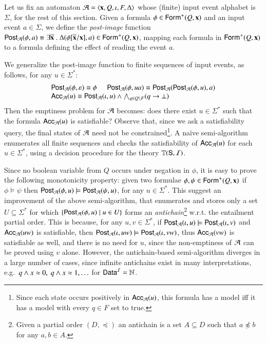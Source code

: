 \documentclass[10pt,conference,letterpaper,twocolumn]{IEEEtran}
\begin{document}
Let us fix an automaton $\mathcal{A} = \left\langle \mathbf x,Q,\iota,F,\Delta \right\rangle$ whose
(finite) input event alphabet is $\Sigma$, for the rest of this
section. Given a formula $\phi \in \mathsf{Form}^+(Q,\mathbf x)$ and an input
event $a \in \Sigma$, we define the \emph{post-image} function
$\mathsf{Post}_{\mathcal{A}}(\phi,a) \equiv \exists \overline{\mathbf x} ~.~
\Delta(\phi[\overline{\mathbf x}/\mathbf x], a) \in \mathsf{Form}^+(Q,\mathbf x)$,
mapping each formula in $\mathsf{Form}^+(Q,\mathbf x)$ to a formula defining the
effect of reading the event $a$.

We generalize the post-image function to finite sequences of input
events, as follows, for any $u \in \Sigma^*$:
\[\begin{array}{l}
\mathsf{Post}_{\mathcal{A}}(\phi,\varepsilon) \equiv \phi \hspace*{5mm} \mathsf{Post}_{\mathcal{A}}(\phi,ua) \equiv \mathsf{Post}_{\mathcal{A}}(\mathsf{Post}_{\mathcal{A}}(\phi,u),a) \\
\mathsf{Acc}_{\mathcal{A}}(u) \equiv \mathsf{Post}_{\mathcal{A}}(\iota,u) \wedge \bigwedge_{q \in Q \setminus F} (q \rightarrow \bot)
\end{array}\]
Then the emptiness problem for $\mathcal{A}$ becomes: does there exist $u \in
\Sigma^*$ such that the formula $\mathsf{Acc}_{\mathcal{A}}(u)$ is satisfiable?
Observe that, since we ask a satisfiability query, the final states of
$\mathcal{A}$ need not be constrained\footnote{ Since each state occurs
  positively in $\mathsf{Acc}_{\mathcal{A}}(u)$, this formula has a model iff it has
  a model with every $q \in F$ set to true.}. A na\"ive semi-algorithm
enumerates all finite sequences and checks the satisfiability of
$\mathsf{Acc}_{\mathcal{A}}(u)$ for each $u \in \Sigma^*$, using a decision procedure
for the theory $\mathbb{T}(\mathsf{S},\mathcal{I})$.

Since no boolean variable from $Q$ occurs under negation in $\phi$, it
is easy to prove the following monotonicity property: given two
formulae $\phi,\psi \in \mathsf{Form}^+(Q,\mathbf x)$ if $\phi \models \psi$
then $\mathsf{Post}_{\mathcal{A}}(\phi,u) \models \mathsf{Post}_{\mathcal{A}}(\psi,u)$, for any $u \in
\Sigma^*$. This suggest an improvement of the above semi-algorithm,
that enumerates and stores only a set $U \subseteq \Sigma^*$ for which
$\left\{ \mathsf{Post}_{\mathcal{A}}(\phi,u) \mid u \in U \right\}$ forms an
\emph{antichain}\footnote{Given a partial order $(D,\preceq)$ an
  antichain is a set $A \subseteq D$ such that $a \not\preceq b$ for
  any $a,b \in A$.} w.r.t. the entailment partial order. This is
because, for any $u,v \in \Sigma^*$, if $\mathsf{Post}_{\mathcal{A}}(\iota,u) \models
\mathsf{Post}_{\mathcal{A}}(\iota,v)$ and $\mathsf{Acc}_{\mathcal{A}}(uw)$ is satisfiable, then
$\mathsf{Post}_{\mathcal{A}}(\iota,uw) \models \mathsf{Post}_{\mathcal{A}}(\iota,vw)$, thus
$\mathsf{Acc}_{\mathcal{A}}(vw)$ is satisfiable as well, and there is no need for
$u$, since the non-emptiness of $\mathcal{A}$ can be proved using $v$
alone. However, the antichain-based semi-algorithm diverges in a large
number of cases, since infinite antichains exist in many
interpretations, e.g.\ $q \wedge x \approx 0,~ q \wedge x \approx 1, \ldots$
for $\mathsf{Data}^{\mathcal{I}} = {\bf \mathbb{N}}$.
\end{document}
